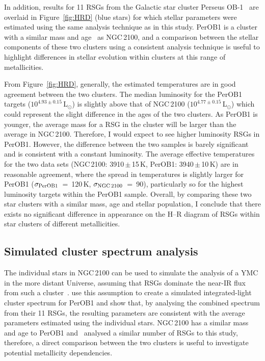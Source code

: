 In addition, results for 11 RSGs from the Galactic star cluster Perseus OB-1~\citep[PerOB1;][]{2014ApJ...787..142G} are overlaid in Figure~\ref{fig:HRD} (blue stars) for which stellar parameters were estimated using the same analysis technique as in this study.
PerOB1 is a cluster with a similar mass and age~\citep[$2\times10^{4}\,$M$_{\odot}$ and 14\,Myr respectively;][]{2010ApJS..186..191C}
as NGC\,2100, and a comparison between the stellar components of these two clusters using a consistent analysis technique is useful to highlight differences in stellar evolution within clusters at this range of metallicities.

From Figure~\ref{fig:HRD}, generally, the estimated temperatures are in good agreement between the two clusters.
The median luminosity for the PerOB1 targets ($10^{4.93\pm0.15}\,$L$_{\odot}$) is slightly above that of NGC\,2100 ($10^{4.77\pm0.15}\,$L$_{\odot}$) which could represent the slight difference in the ages of the two clusters.
As PerOB1 is younger, the average mass for a RSG in the cluster will be larger than the average in NGC\,2100.
Therefore, I would expect to see higher luminosity RSGs in PerOB1.
However, the difference between the two samples is barely significant and is consistent with a constant luminosity.
The average effective temperatures for the two data sets (NGC\,2100: 3910\,$\pm$\,15\,K, PerOB1: 3940\,$\pm$\,10\,K) are in reasonable agreement, where the spread in temperatures is slightly larger for PerOB1
($\sigma_{\rm PerOB1}$~=~120\,K, $\sigma_{\rm NGC\,2100}$~=~90),
particularly so for the highest luminosity targets within the PerOB1 sample.
Overall, by comparing these two star clusters with a similar mass, age and stellar population, I conclude that there exists no significant difference in appearance on the H--R diagram of RSGs within star clusters of different metallicities.


\subsection{Simulated cluster spectrum analysis} %
\label{sub:integrated_light_cluster_analysis}

The individual stars in NGC\,2100 can be used to simulate the analysis of a YMC in the more distant Universe, assuming that RSGs dominate the near-IR flux from such a cluster~\citep{2013MNRAS.430L..35G}.
\cite{2014ApJ...788...58G} use this assumption to create a simulated integrated-light cluster spectrum for PerOB1 and show that, by analysing the combined spectrum from their 11 RSGs, the resulting parameters are consistent with the average parameters estimated using the individual stars.
NGC\,2100 has a similar mass and age to PerOB1 and~\cite{2014ApJ...788...58G} analysed a similar number of RSGs to this study,
therefore, a direct comparison between the two clusters is useful to investigate potential metallicity dependencies.

